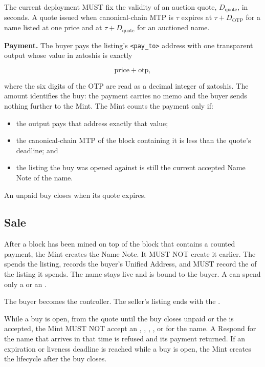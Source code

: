 The current \zns{} deployment MUST fix the validity of an auction quote, $D_{\text{quote}}$, in seconds. A quote issued when canonical-chain MTP is $\tau$ expires at $\tau + D_{\text{OTP}}$ for a name listed at one price and at $\tau + D_{\text{quote}}$ for an auctioned name.

\textbf{Payment.} The buyer pays the listing's \texttt{<pay\_to>} address with one transparent output whose value in zatoshis is exactly

$$\text{price} + \text{otp},$$

where the six digits of the OTP are read as a decimal integer of zatoshis. The amount identifies the buy: the payment carries no memo and the buyer sends nothing further to the Mint. The Mint counts the payment only if:

\begin{itemize}
  \item the output pays that address exactly that value;
  \item the canonical-chain MTP of the block containing it is less than the quote's deadline; and
  \item the listing the buy was opened against is still the current accepted Name Note of the name.
\end{itemize}

An unpaid buy closes when its quote expires.

\subsection{Sale}

After a block has been mined on top of the block that contains a counted payment, the Mint creates the  Name Note. It MUST NOT create it earlier. The  spends the listing, records the buyer's Unified Address, and MUST record the  of the listing it spends. The name stays live and is bound to the buyer. A  can spend only a  or an .

The buyer becomes the controller. The seller's listing ends with the .

While a buy is open, from the quote until the buy closes unpaid or the  is accepted, the Mint MUST NOT accept an , , , , or  for the name. A Respond for the name that arrives in that time is refused and its payment returned. If an expiration or liveness deadline is reached while a buy is open, the Mint creates the lifecycle  after the buy closes.

